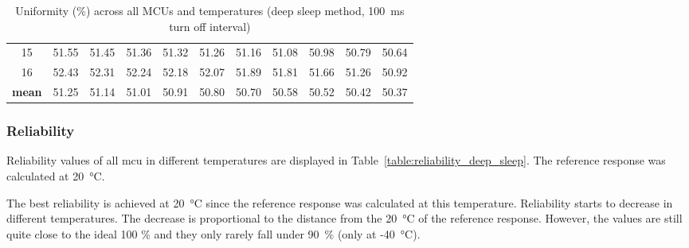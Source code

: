 \begin{table}[ht!]
\begin{tabular}{c||rrrrrrrrrr}
    15   &  51.55 &  51.45 &  51.36 &  51.32 & 51.26 & 51.16 & 51.08 & 50.98 & 50.79 & 50.64 \\
    16   &  52.43 &  52.31 &  52.24 &  52.18 & 52.07 & 51.89 & 51.81 & 51.66 & 51.26 & 50.92 \\
    \textbf{mean} &  51.25 &  51.14 &  51.01 &  50.91 & 50.80 & 50.70 & 50.58 & 50.52 & 50.42 & 50.37 \\
    \bottomrule
    \end{tabular}
    \captionsetup{justification=centering,margin=0.5cm}
    \caption{Uniformity (\%) across all MCUs and temperatures (deep sleep method, 100~ms turn off interval)}
    \label{table:uniformity_deep_sleep}
    \vspace{-0.7cm}
\end{table}

\subsubsection*{Reliability}

Reliability values of all \gls{mcu} in different temperatures are displayed in Table~\ref{table:reliability_deep_sleep}. The reference response was calculated at 20~°C.

The best reliability is achieved at 20~°C since the reference response was calculated at this temperature. Reliability starts to decrease in different temperatures. The decrease is proportional to the distance from the 20~°C of the reference response. However, the values are still quite close to the ideal 100 \% and they only rarely fall under 90~\% (only at -40~°C).

